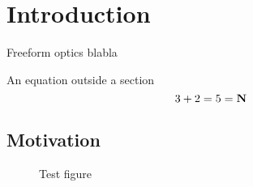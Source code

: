 \chapter{Introduction}
\label{ch:intro}

Freeform optics blabla

An equation outside a section
\begin{equation}
3+2=5 = \mathbf{N}
\label{eq1:tst_eq}
\end{equation}

\section{Motivation}
\begin{figure}
\centering
\caption{Test figure}
\end{figure}
